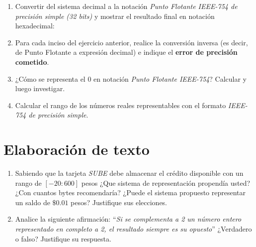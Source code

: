 \documentclass[12pt]{article}
\begin{document}
\begin{enumerate}

    \item Convertir del sistema decimal a la notación \emph{Punto Flotante
        IEEE-754 de precisión simple (32 bits)} y mostrar el resultado final
        en notación hexadecimal:


    \item Para cada inciso del ejercicio anterior, realice la conversión
        inversa (es decir, de Punto Flotante a expresión decimal) e indique el
        \textbf{error de precisión cometido}.

    \item ¿Cómo se representa el 0 en notación \emph{Punto Flotante IEEE-754}?
        Calcular y luego investigar.

    \item Calcular el rango de los números reales representables con el
        formato \emph{IEEE-754 de precisión simple}.

\end{enumerate}

\section{Elaboración de texto}

\begin{enumerate}

    \item Sabiendo que la tarjeta \textit{SUBE} debe almacenar el crédito
        disponible con un rango de $[-20:600]$ pesos ¿Que sistema de
        representación propendía usted? ¿Con cuantos bytes recomendaría?
        ¿Puede el sistema propuesto representar un saldo de $\$0.01$ pesos?
        Justifique sus elecciones.

    \item Analice la siguiente afirmación: ``\emph{Si se complementa a 2 un
        número entero representado en completo a 2, el resultado siempre es su
        opuesto}'' ¿Verdadero o falso? Justifique su respuesta.

\end{enumerate}
\end{document}
